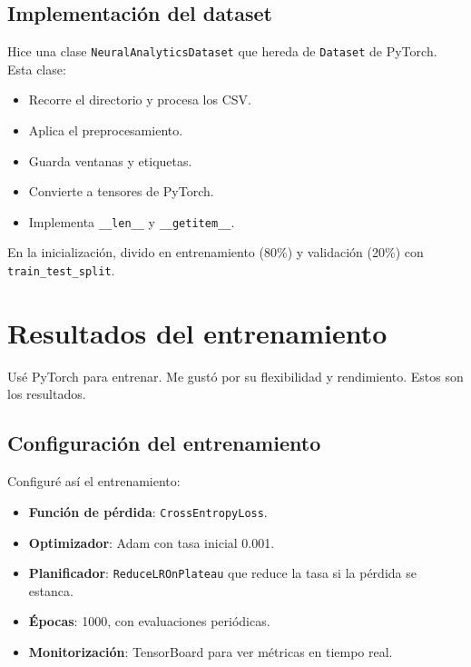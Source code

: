 \subsection{Implementación del dataset}

Hice una clase \texttt{NeuralAnalyticsDataset} que hereda de \texttt{Dataset} de PyTorch. Esta clase:

\begin{itemize}
    \item Recorre el directorio y procesa los CSV.
    \item Aplica el preprocesamiento.
    \item Guarda ventanas y etiquetas.
    \item Convierte a tensores de PyTorch.
    \item Implementa \texttt{\_\_len\_\_} y \texttt{\_\_getitem\_\_}.
\end{itemize}

En la inicialización, divido en entrenamiento (80\%) y validación (20\%) con \texttt{train\_test\_split}.

\section{Resultados del entrenamiento}

Usé PyTorch para entrenar. Me gustó por su flexibilidad y rendimiento. Estos son los resultados.

\subsection{Configuración del entrenamiento}

Configuré así el entrenamiento:

\begin{itemize}
    \item \textbf{Función de pérdida}: \texttt{CrossEntropyLoss}.
    
    \item \textbf{Optimizador}: Adam con tasa inicial 0.001.
    
    \item \textbf{Planificador}: \texttt{ReduceLROnPlateau} que reduce la tasa si la pérdida se estanca.
    
    \item \textbf{Épocas}: 1000, con evaluaciones periódicas.
    
    \item \textbf{Monitorización}: TensorBoard para ver métricas en tiempo real.
\end{itemize}

